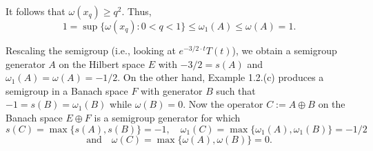 \begin{example}
\noindent It follows that $\omega(x_q) \geq q^2$. 
Thus,
\[
1 = \sup \{\omega(x_q) : 0 < q < 1\} \leq \omega_1(A) \leq \omega(A) = 1.
\]

\noindent Rescaling the semigroup (i.e., looking at $e^{-3/2 \cdot t} T(t)$), we obtain a semigroup generator $A$ on the Hilbert space $E$ with $-3/2 = s(A)$ and $\omega_1(A) = \omega(A) = -1/2$. 
On the other hand, Example 1.2.(c) produces a semigroup in a Banach space $F$ with generator $B$ such that $-1 = s(B) = \omega_1(B)$ while $\omega(B) = 0$. 
Now the operator $C := A \oplus B$ on the Banach space $E \oplus F$ is a semigroup generator for which
\[
s(C) = \max \{s(A), s(B)\} = -1, \quad \omega_1(C) = \max\{\omega_1(A), \omega_1(B)\} = -1/2
\]
\[
\text{and} \quad \omega(C) = \max\{\omega(A), \omega(B)\} = 0.
\]
\end{example}



